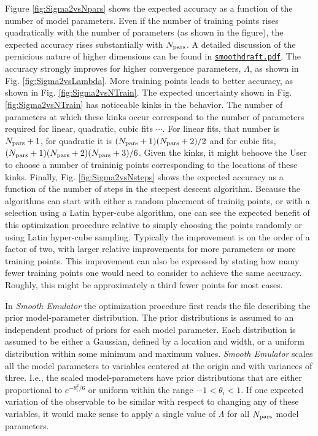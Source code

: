\documentclass[UserManual.tex]{subfiles}
\begin{document}
Figure \ref{fig:Sigma2vsNpars} shows the expected accuracy as a function of the number of model parameters. Even if the number of training points rises quadratically with the number of parameters (as shown in the figure), the expected accuracy rises substantially with $N_{\rm pars}$. A detailed discussion of the pernicious nature of higher dimensions can be found in  \href{./smoothdraft.pdf}{{\tt smoothdraft.pdf}}. The accuracy strongly improves for higher convergence parameters, $\Lambda$, as shown in Fig. \ref{fig:Sigma2vsLambda}. More training points leads to better accuracy, as shown in Fig. \ref{fig:Sigma2vsNTrain}. The expected uncertainty shown in Fig. \ref{fig:Sigma2vsNTrain} has noticeable kinks in the behavior. The number of parameters at which these kinks occur correspond to the number of parameters required for linear, quadratic, cubic fits $\cdots$. For linear fits, that number is $N_{\rm pars}+1$, for quadratic it is $(N_{\rm pars}+1)(N_{\rm pars}+2)/2$ and for cubic fits, $(N_{\rm pars}+1)(N_{\rm pars}+2)(N_{\rm pars}+3)/6$. Given the kinks, it might behoove the User to choose a number of traininig points corresponding to the locations of these kinks. Finally, Fig. \ref{fig:Sigma2vsNsteps} shows the expected accuracy as a function of the number of steps in the steepest descent algorithm. Because the algorithms can start with either a random placement of trainiig points, or with a selection using a Latin hyper-cube algorithm, one can see the expected benefit of this optimization procedure relative to simply choosing the points randomly or using Latin hyper-cube sampling. Typically the improvement is on the order of a factor of two, with larger relative improvements for more parameters or more training points. This improvement can also be expressed by stating how many fewer training points one would need to consider to achieve the same accuracy. Roughly, this might be approximately a third fewer points for most cases.

In {\it Smooth Emulator} the optimization procedure first reads the file describing the prior model-parameter distribution. The prior distributions is assumed to an independent product of priors for each model parameter. Each distribution is assumed to be either a Gaussian, defined by a location and width, or a uniform distribution within some minimum and maximum values. {\it Smooth Emulator} scales all the model parameters to variables centered at the origin and with variances of three. I.e., the scaled model-parameters have prior distributions that are either proportional to $e^{-\theta_i^2/6}$ or uniform within the range $-1<\theta_i<1$. If one expected variation of the observable to be similar with respect to changing any of these variables, it would make sense to apply a single value of $\Lambda$ for all $N_{\rm pars}$ model parameters.
\end{document}
